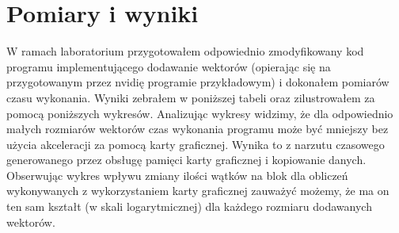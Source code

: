 \documentclass{article}
\begin{document}
    \section{Pomiary i wyniki}
        W ramach laboratorium przygotowałem odpowiednio zmodyfikowany kod programu implementującego dodawanie wektorów (opierając się na przygotowanym przez nvidię programie przykładowym) i dokonałem pomiarów czasu wykonania. Wyniki zebrałem w poniższej tabeli oraz zilustrowałem za pomocą poniższych wykresów. Analizując wykresy widzimy, że dla odpowiednio małych rozmiarów wektorów czas wykonania programu może być mniejszy bez użycia akceleracji za pomocą karty graficznej. Wynika to z narzutu czasowego generowanego przez obsługę pamięci karty graficznej i kopiowanie danych. Obserwując wykres wpływu zmiany ilości wątków na blok dla obliczeń wykonywanych z wykorzystaniem karty graficznej zauważyć możemy, że ma on ten sam kształt (w skali logarytmicznej) dla każdego rozmiaru dodawanych wektorów.
\end{document}
